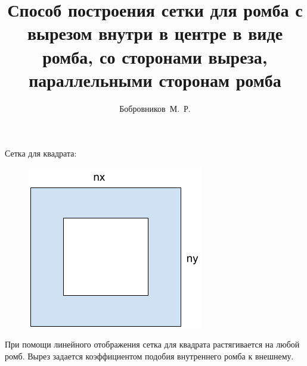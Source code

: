 \documentclass[a4paper, 12pt]{article}
\begin{document}
\title{Способ построения сетки для ромба с вырезом внутри в центре в виде ромба, со сторонами
выреза, параллельными сторонам ромба}
\author{Бобровников~М.~Р.}
\date{}
\maketitle
Сетка для квадрата:
\begin{figure}[H]
\includegraphics[]{paint}
    \end{figure}
При помощи линейного отображения сетка для квадрата растягивается на любой ромб.
Вырез задается коэффициентом подобия внутреннего ромба к внешнему.
\end{document}

